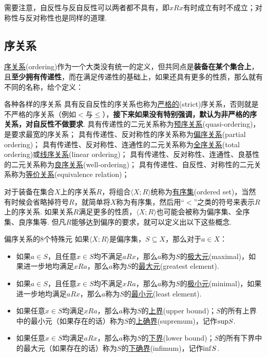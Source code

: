 \documentclass[main.tex]{subfiles}
\begin{document}
需要注意，自反性与反自反性可以两者都不具有，即\(xRx\)有时成立有时不成立；对称性与反对称性也是同样的道理. 

\subsection{序关系}

\uline{序关系}(ordering)作为一个大类没有统一的定义，但共同点是\textbf{装备在某个集合上}，且\textbf{至少拥有传递性}，而在满足传递性的基础上，如果还具有更多的性质，那么就有不同的名称，给个定义：
\begin{definition}{各种各样的序关系}
    具有反自反性的序关系也称为\uline{严格的}(strict)序关系，否则就是不严格的序关系（例如\(<\)与\(\leq\)），\textbf{接下来如果没有特别强调，默认为非严格的序关系，对自反性不做要求}.
    \newline
    具有传递性的二元关系称为\uline{预序关系}(quasi-ordering)，是要求最宽的序关系；
    \newline
    具有传递性、反对称性的序关系称为\uline{偏序关系}(partial ordering)；
    \newline
    具有传递性、反对称性、连通性的二元关系称为\uline{全序关系}(total ordering)或\uline{线序关系}(linear ordering)；
    \newline
    具有传递性、反对称性、连通性、良基性的二元关系称为\uline{良序关系}(well-ordering)；
    \newline
    具有传递性、自反性、对称性的二元关系称为\uline{等价关系}(equivalence relation)；
\end{definition}
对于装备在集合\(X\)上的序关系\(R\)，将组合\(\langle X; R\rangle\)统称为\uline{有序集}(ordered set)，当然有时候会省略掉符号\(R\)，就简单将\(X\)称为有序集，然后用“\(<\)”之类的符号来表示\(R\)上的序关系. 如果关系\(R\)满足更多的性质，\(\langle X; R\rangle\)也可能会被称为偏序集、全序集、良序集等. 但凡\(R\)能够达到偏序的要求，就可以定义出以下这些概念.

\begin{definition}{偏序关系的8个特殊元}
    如果\(\langle X; R\rangle\)是偏序集，\(S \subseteq X\)，那么对于\(a \in X\)：
    \begin{itemize}
        \item  如果\(a \in S\)，且任意\(x \in S\)均不满足\(aRx\)，那么\(a\)称为\(S\)的\uline{极大元}(maximal)，如果进一步地均满足\(xRa\)，那么\(a\)称为\(S\)的\uline{最大元}(greatest element).
        \item  如果\(a \in S\)，且任意\(x \in S\)均不满足\(xRa\)，那么\(a\)称为\(S\)的\uline{极小元}(minimal)，如果进一步地均满足\(aRx\)，那么\(a\)称为\(S\)的\uline{最小元}(least element).
        \item  如果任意\(x \in S\)均满足\(xRa\)，那么\(a\)称为\(S\)的\uline{上界}(upper bound)；\(S\)的所有上界中的最小元（如果存在的话）称为\(S\)的\uline{上确界}(supremum)，记作\({\rm sup}S\).
        \item  如果任意\(x \in S\)均满足\(aRx\)，那么\(a\)称为\(S\)的\uline{下界}(lower bound)；\(S\)的所有下界中的最大元（如果存在的话）称为\(S\)的\uline{下确界}(infimum)，记作\({\rm inf}S\).
    \end{itemize}
\end{definition}
\end{document}

